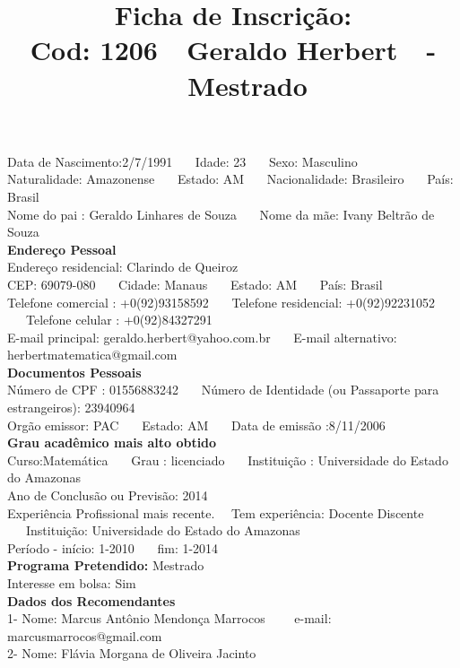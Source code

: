 \documentclass[11pt]{article}
\title{\vspace*{-4cm} Ficha de Inscrição: \\Cod: 1206\ \ Geraldo Herbert\ \ - \ \ Mestrado 
 }
\date{}
\begin{document}
\maketitle
\vspace*{-1.5cm}
\noindent Data de Nascimento:2/7/1991
\ \ \ Idade: 23   \ \ \ Sexo: Masculino
\\
Naturalidade: Amazonense  
\ \ \  Estado: AM
\ \ \  Nacionalidade: Brasileiro
\ \ \ País: Brasil
\\        
Nome do pai : Geraldo Linhares de Souza
\ \ \ Nome da mãe: Ivany Beltrão de Souza          
\\[0.2cm]                     
\textbf{Endereço Pessoal} 
\\ 
\noindent Endereço residencial: Clarindo de Queiroz
\\
        CEP: 69079-080 
\ \ \ Cidade: Manaus 
\ \ \ Estado: AM 
\ \ \ País: Brasil
\\		
		Telefone comercial : +0(92)93158592
\ \ \ Telefone residencial: +0(92)92231052
\ \ \ Telefone celular : +0(92)84327291
\\
E-mail principal: geraldo.herbert@yahoo.com.br
\ \ \ E-mail alternativo: herbertmatematica@gmail.com 
\\[0.2cm] 
\textbf{Documentos Pessoais}
\\
\noindent Número de CPF : 01556883242
\ \ \ Número de Identidade (ou Passaporte para estrangeiros): 23940964
\\
Orgão emissor: PAC
\ \ \ Estado: AM
\ \ \ Data de emissão :8/11/2006
\\[0.3cm]
\textbf{Grau acadêmico mais alto obtido}
\\	
Curso:Matemática
\ \ \ Grau : licenciado
\ \ \ Instituição : Universidade do Estado do Amazonas
\\			
Ano de Conclusão ou Previsão: 2014
\\ 
Experiência Profissional mais recente. \ \  
Tem experiência: Docente Discente  
\ \ \ Instituição: Universidade do Estado do Amazonas
\\  
Período - início: 1-2010
\ \ \ fim: 1-2014
\\[0.2cm] 
\textbf{Programa Pretendido:} Mestrado\\
Interesse em bolsa: Sim
\\[0.3cm]		
\textbf{Dados dos Recomendantes} 
\\
1- Nome: Marcus Antônio Mendonça Marrocos
\ \ \ \  e-mail: marcusmarrocos@gmail.com 
\\
2- Nome: Flávia Morgana de Oliveira Jacinto
\end{document}
